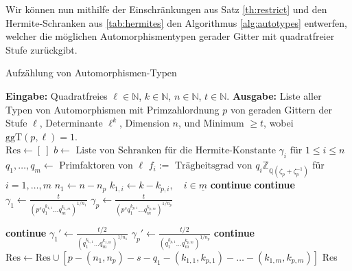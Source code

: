 \documentclass[12pt,a4paper,halfparskip,headsepline,bibtotocnumbered]{scrreprt}
\theoremstyle{nummermitklammern}
\theoremstyle{nonumberbreak}
\newcommand{\N}{\mathbb{N}}
\newcommand{\Z}{\mathbb{Z}}
\newcommand{\Q}{\mathbb{Q}}
\newcommand{\ggT}{\text{ggT}}
\begin{document}
Wir können nun mithilfe der Einschränkungen aus Satz \eqref{th:restrict} und den Hermite-Schranken aus \eqref{tab:hermites} den Algorithmus \eqref{alg:autotypes} entwerfen, welcher die möglichen Automorphismentypen gerader Gitter mit quadratfreier Stufe zurückgibt.

\begin{algorithm}[H]
	\caption{Aufzählung von Automorphismen-Typen}\label{alg:autotypes}
	\begin{algorithmic}[1]
		\State \textbf{Eingabe:} Quadratfreies $\ell \in \N$, $k \in \N$, $n \in \N$, $t \in \N$.
		\State \textbf{Ausgabe:} Liste aller Typen von Automorphismen mit Primzahlordnung $p$ von geraden Gittern der Stufe $\ell$, Determinante $\ell^k$, Dimension $n$, und Minimum $\geq t$, wobei $\ggT(p, \ell) = 1$.
		\\
		\State $\text{Res} \gets \left[ \ \right]$
		\State $b \gets \text{ Liste von Schranken für die Hermite-Konstante } \gamma_i \text{ für } 1 \leq i \leq n$
		\State $q_1, \dots, q_m \gets$ Primfaktoren von $\ell$
			\State $f_i := \text{ Trägheitsgrad von } q_i \Z_{\Q(\zeta_p + \zeta_p^{-1})}$ für $i=1, \dots, m$
				\State $n_1 \gets n - n_p$
					\State $k_{1,i} \gets k - k_{p,i}, \quad i \in \underline{m}$
						\State \textbf{continue}
					\EndIf
						 \textbf{continue} \EndIf
						\State $\gamma_1 \gets \frac{t}{\left(p^s q_1^{k_{1,1}} \dots q_m^{k_{1,m}}\right)^{1/n_1}}$
						\State $\gamma_p \gets \frac{t}{\left(p^s q_1^{k_{p,1}} \dots q_m^{k_{p,m}}\right)^{1/n_p}}$
						
						 \textbf{continue} \EndIf
							\State $\gamma_1' \gets \frac{t/2}{\left(q_1^{k_{1,1}} \dots q_m^{k_{1,m}}\right)^{1/n_1}}$
							\State $\gamma_p' \gets \frac{t/2}{\left(q_1^{k_{p,1}} \dots q_m^{k_{p,m}}\right)^{1/n_p}}$
							 \textbf{continue} \EndIf
						\EndIf
						\State $\text{Res} \gets \text{Res} \cup \left[ p - (n_1, n_p) - s - q_1 - (k_{1,1}, k_{p,1}) - \dots - (k_{1,m}, k_{p,m}) \right]$
					\EndFor
				\EndFor 
			\EndFor
		\EndFor
		\State \Return Res
	\end{algorithmic}
\end{algorithm}
\end{document}
